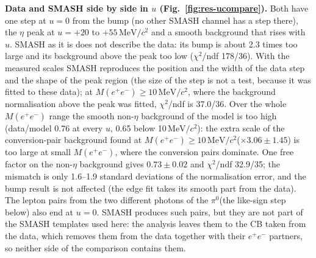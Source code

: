 \documentclass[11pt,a4paper]{article}
\newcommand{\piz}{\ensuremath{\pi^{0}}\xspace}
\newcommand{\ee}{\ensuremath{e^{+}e^{-}}\xspace}
\newcommand{\Mee}{\ensuremath{M(e^{+}e^{-})}\xspace}
\newcommand{\MeVcc}{\ensuremath{\mathrm{MeV}/c^{2}}\xspace}
\begin{document}
\textbf{Data and SMASH side by side in $u$ (Fig.~\ref{fig:res-ucompare}).} Both have one step at $u=0$ from the bump (no
other SMASH channel has a step there), the $\eta$ peak at $u=+20$ to $+55$\,\MeVcc and a smooth background that rises with $u$. SMASH as it is
does not describe the data: its bump is about 2.3 times too large and its background above the peak too low ($\chi^2$/ndf 178/36). With the
measured scales SMASH reproduces the position and the width of the data step and the shape of the peak region (the size of the step is not a
test, because it was fitted to these data); at \Mee$\ge10$\,\MeVcc, where the background normalisation above the peak was fitted, $\chi^2$/ndf
is 37.0/36. Over the whole \Mee range the smooth non-$\eta$ background of the model is too high (data/model 0.76 at every $u$, 0.65 below
10\,\MeVcc): the extra scale of the conversion-pair background found at \Mee$\ge10$\,\MeVcc ($\times3.06\pm1.45$) is too large at small \Mee,
where the conversion pairs dominate. One free factor on the non-$\eta$ background gives $0.73\pm0.02$ and $\chi^2$/ndf 32.9/35; the mismatch is
only 1.6--1.9 standard deviations of the normalisation error, and the bump result is not affected (the edge fit takes its smooth part from the data).
The lepton pairs from the two different photons of the \piz (the like-sign step below) also end at $u=0$. SMASH produces such pairs, but they
are not part of the SMASH templates used here: the analysis leaves them to the CB taken from the data, which removes them from the data
together with their \ee partners, so neither side of the comparison contains them.
\end{document}
